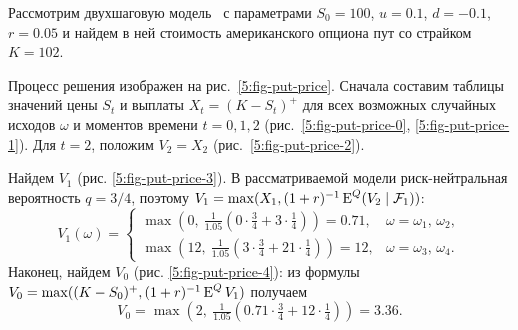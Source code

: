 \begin{example}
\label{am-d:e:price}
Рассмотрим двухшаговую модель \crr\ с параметрами $S_0=100$, $u=0.1$, $d=-0.1$, $r=0.05$ и найдем в ней стоимость американского опциона пут со страйком $K=102$.

Процесс решения изображен на рис.~\ref{5:fig-put-price}.
Сначала составим таблицы значений цены $S_t$ и выплаты $X_t = (K-S_t)^+$ для всех возможных случайных исходов $\omega$ и моментов времени $t=0,1,2$ (рис.~\ref{5:fig-put-price-0}, \ref{5:fig-put-price-1}).
Для $t=2$, положим $V_2 = X_2$ (рис.~\ref{5:fig-put-price-2}). 

Найдем $V_1$ (рис. \ref{5:fig-put-price-3}).
В рассматриваемой модели риск-нейтральная вероятность $q=3/4$, поэтому $V_1 = \max(X_1, (1+r)^{-1}\operatorname{E}^Q(V_2\mid \mathcal{F}_1))$:
\[
V_1(\omega) = 
\begin{cases}
\max(0,\ \tfrac{1}{1.05}(0\cdot\tfrac34 + 3\cdot\tfrac14)) = 0.71,
  &\omega=\omega_1,\,\omega_2,\\
\max(12,\ \tfrac{1}{1.05}(3\cdot\tfrac34 + 21\cdot\tfrac14)) = 12,
  &\omega=\omega_3,\,\omega_4.
\end{cases}
\]
Наконец, найдем $V_0$ (рис. \ref{5:fig-put-price-4}): из формулы $V_0 = \max((K-S_0)^+, (1+r)^{-1}\operatorname{E}^Q V_1)$ получаем
\[
V_0 = \max(2,\ \tfrac{1}{1.05} (0.71\cdot\tfrac34 + 12\cdot\tfrac14)) = 3.36.
\]


\end{example}

